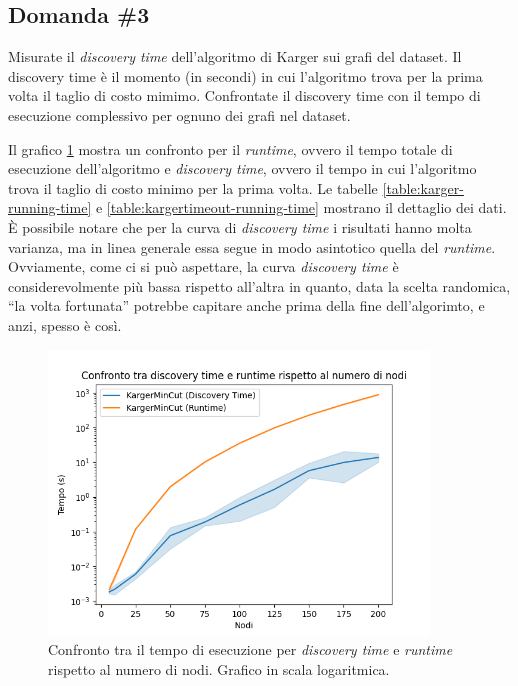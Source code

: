 \subsection{Domanda \#3}
\label{sec:question-3}

\begin{displayquote}
Misurate il \textit{discovery time} dell'algoritmo di Karger sui grafi
del dataset. Il discovery time è il momento (in secondi) in cui
l'algoritmo trova per la prima volta il taglio di costo mimimo.
Confrontate il discovery time con il tempo di esecuzione complessivo
per ognuno dei grafi nel dataset.
\end{displayquote}

\noindent Il grafico \ref{fig:karger-discovery-vs-program-time-chart}
mostra un confronto per il \emph{runtime}, ovvero il tempo totale di
esecuzione dell'algoritmo e \emph{discovery time}, ovvero il tempo in
cui l'algoritmo trova il taglio di costo minimo per la prima volta.
Le tabelle \ref{table:karger-running-time} e
\ref{table:kargertimeout-running-time} mostrano il dettaglio dei
dati. \\

\noindent È possibile notare che per la curva di \emph{discovery time}
i risultati hanno molta varianza, ma in linea generale essa segue in
modo asintotico quella del \emph{runtime}.\\

\noindent Ovviamente, come ci si può aspettare, la curva
\emph{discovery time} è considerevolmente più bassa rispetto all'altra
in quanto, data la scelta randomica, ``la volta fortunata'' potrebbe
capitare anche prima della fine dell'algorimto, e anzi, spesso è così.

\begin{figure}[H]
    \centering

    \includegraphics[width=0.9\textwidth]{./images/Confronto_tra_discovery_time_e_runtime_rispetto_al_numero_di_nodi.png}

    \caption{Confronto tra il tempo di esecuzione per \emph{discovery time} e \emph{runtime} rispetto al numero di nodi. Grafico in scala logaritmica.}
    \label{fig:karger-discovery-vs-program-time-chart}
\end{figure}

